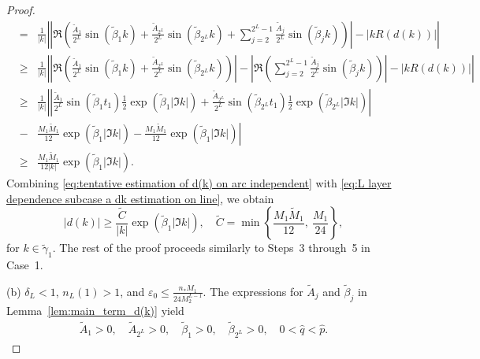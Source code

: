 \documentclass[11pt,reqno]{amsart}
\theoremstyle{definition}
\theoremstyle{remark}
\numberwithin{equation}{section}
\begin{document}
\begin{proof}
\begin{eqnarray}
      &=&\frac{1}{|k|}\left| \left|\Re\left(\frac{\tilde{A}_1}{2^L}\sin\left(\tilde{\beta}_1k\right)+\frac{\tilde{A}_{2^L}}{2^L}\sin\left(\tilde{\beta}_{2^L}k\right)+\sum_{j=2}^{2^L-1}\frac{\tilde{A}_j}{2^L}\sin\left(\tilde{\beta}_jk\right)\right)\right|-\left|kR(d(k))\right| \right| \nonumber \\
      &\geq&\frac{1}{|k|}\left| \left|\Re\left(\frac{\tilde{A}_1}{2^L}\sin\left(\tilde{\beta}_1k\right)+\frac{\tilde{A}_{2^L}}{2^L}\sin\left(\tilde{\beta}_{2^L}k\right)\right)\right|-\left|\Re\left(\sum_{j=2}^{2^L-1}\frac{\tilde{A}_j}{2^L}\sin\left(\tilde{\beta}_jk\right)\right)\right|-|kR(d(k))| \right| \nonumber \\
      &\geq& \frac{1}{|k|}\left| \left|\frac{\tilde{A}_1}{2^L}\sin\left(\tilde{\beta}_1t_1\right)\frac{1}{2}\exp{\left(\tilde{\beta}_1|\Im k|\right)}+\frac{\tilde{A}_{2^L}}{2^L}\sin\left(\tilde{\beta}_{2^L}t_1\right)\frac{1}{2}\exp{\left(\tilde{\beta}_{2^L}|\Im k|\right)}\right|\right. \nonumber \\
      &-&\left.\frac{M_1\widetilde{M}_1}{12}\exp{\left(\tilde{\beta}_1|\Im k|\right)}-\frac{M_1\widetilde{M}_1}{12}\exp{\left(\tilde{\beta}_1|\Im k|\right)} \right| \nonumber \\
      &\geq&\frac{M_1\widetilde{M}_1}{12|k|}\exp{\left(\tilde{\beta}_1|\Im k|\right)}.~
\end{eqnarray}
Combining \eqref{eq:tentative estimation of d(k) on arc independent} with \eqref{eq:L layer dependence subcase a dk estimation on line}, we obtain
\begin{equation*}
    |d(k)| \geq \frac{\widetilde{C}}{|k|}\exp{\left(\tilde{\beta}_1|\Im k|\right)},\quad \widetilde{C}=\min\left\{\frac{M_1\widetilde{M}_1}{12},~\frac{M_1}{24}\right\},~
\end{equation*}
for $k\in \tilde{\gamma}_1$. The rest of the proof proceeds similarly to Steps~3 through~5 in Case~1.
      
(b) $\delta_L<1$, $n_L(1)>1$, and $\varepsilon_0\leq \frac{n_{*}M_1}{24M_2^{L-1}}$. The expressions for $\tilde{A}_j$ and $\tilde{\beta}_j$ in Lemma~\ref{lem:main_term_d(k)} yield  
\begin{equation}\label{eq:L layer dependence subcase b first set up}
    \begin{aligned}
        \tilde{A}_1>0,\quad \tilde{A}_{2^L}>0,\quad \tilde{\beta}_1>0,\quad \tilde{\beta}_{2^L}>0,\quad 0<\hat{q}<\hat{p}.~
    \end{aligned}
\end{equation}


\end{proof}
\end{document}
